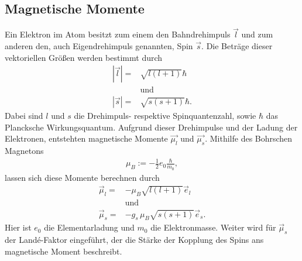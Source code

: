 \subsection{Magnetische Momente}
Ein Elektron im Atom besitzt zum einem den Bahndrehimpuls $\vec{l}$ und zum anderen
den, auch Eigendrehimpuls genannten, Spin $\vec{s}$.
Die Beträge dieser vektoriellen Größen werden bestimmt durch
\begin{align}
	|\vec{l}|=&\sqrt{l(l+1)}\hbar\\
	\nonumber &\text{und}\\
	|\vec{s}|=&\sqrt{s(s+1)}\hbar.
\end{align}
Dabei sind $l$ und $s$ die Drehimpuls- respektive Spinquantenzahl, sowie $\hbar$ das Plancksche Wirkungsquantum.
Aufgrund dieser Drehimpulse und der Ladung der Elektronen,
entstehten magnetische Momente $\vec{\mu_l}$ und $\vec{\mu_s}$.
Mithilfe des Bohrschen Magnetons
\begin{align}
	\mu_B:=-\frac{1}{2}e_0 \frac{\hbar}{m_0},
\end{align}
lassen sich diese Momente berechnen durch
\begin{align}
	\vec{\mu}_l=&-\mu_B\sqrt{l(l+1)}\vec{e}_l\\
	\nonumber &\text{und}\\
	\vec{\mu}_s=&-g_s\,\mu_B\sqrt{s(s+1)}\vec{e}_s.
\end{align}
Hier ist $e_0$ die Elementarladung und $m_0$ die Elektronmasse.
Weiter wird für $\vec{\mu}_s$ der Landé-Faktor eingeführt, der die Stärke der Kopplung
des Spins ans magnetische Moment beschreibt.

